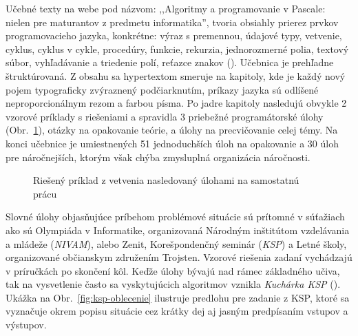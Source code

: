 Učebné texty na webe pod názvom: ,,Algoritmy a programovanie v Pascale: nielen pre maturantov z predmetu informatika'', tvoria obsiahly prierez prvkov programovacieho jazyka, konkrétne: výraz s premennou, údajové typy, vetvenie, cyklus, cyklus v cykle, procedúry, funkcie, rekurzia, jednorozmerné polia, textový súbor, vyhľadávanie a triedenie polí, reťazce znakov (\cite{hedvigova_algoritmy_2007}). Učebnica je prehľadne štruktúrovaná. Z obsahu sa hypertextom smeruje na kapitoly, kde je každý nový pojem typograficky zvýraznený podčiarknutím, príkazy jazyka sú odlíšené neproporcionálnym rezom a farbou písma. Po jadre kapitoly nasledujú obvykle 2 vzorové príklady s riešeniami a spravidla 3 priebežné programátorské úlohy (Obr.~\ref{fig:uloha-pascal}), otázky na opakovanie teórie, a úlohy na precvičovanie celej témy. Na konci učebnice je umiestnených 51 jednoduchších úloh na opakovanie a 30 úloh pre náročnejších, ktorým však chýba zmysluplná organizácia náročnosti.

\begin{figure}[h]
\centering
{}
\caption{Riešený príklad z vetvenia nasledovaný úlohami na samostatnú prácu}
\label{fig:uloha-pascal}
\end{figure}

Slovné úlohy objasňujúce príbehom problémové situácie sú prítomné v súťažiach ako sú Olympiáda v Informatike, organizovaná Národným inštitútom vzdelávania a mládeže (\emph{NIVAM}), alebo Zenit, Korešpondenčný seminár (\emph{KSP}) a Letné školy, organizované občianskym združením Trojsten. Vzorové riešenia zadaní vychádzajú v príručkách po skončení kôl. Keďže úlohy bývajú nad rámec základného učiva, tak na vysvetlenie často sa vyskytujúcich algoritmov vznikla \emph{Kuchárka KSP} (\cite{noauthor_kucharka_2022}). Ukážka na Obr.~\ref{fig:ksp-oblecenie} ilustruje predlohu pre zadanie z KSP, ktoré sa vyznačuje okrem popisu situácie cez krátky dej aj jasným predpísaním vstupov a výstupov. 

